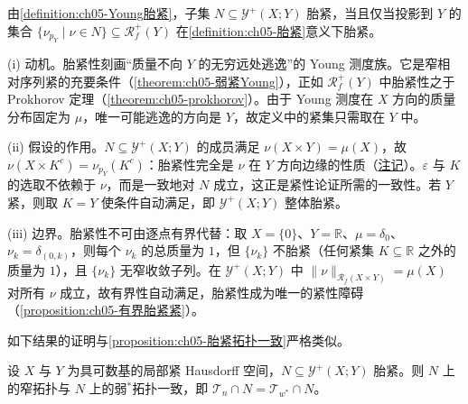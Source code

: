 \documentclass[../../main.tex]{subfiles}%
\begin{document}
\begin{remark}\label{remark:ch05-Young胎紧投影}
由\cref{definition:ch05-Young胎紧}，子集 $N\subseteq\mathcal{Y}^+(X;Y)$ 胎紧，当且仅当投影到 $Y$ 的集合 $\{\nu_{p_Y}\mid\nu\in N\}\subseteq\mathscr{R}^+_f(Y)$ 在\cref{definition:ch05-胎紧}意义下胎紧。
\end{remark}

\begin{remark}\label{remark:ch05-Young胎紧动机}
(i) 动机。胎紧性刻画“质量不向 $Y$ 的无穷远处逃逸”的 Young 测度族。它是窄相对序列紧的充要条件（\cref{theorem:ch05-弱紧Young}），正如 $\mathscr{R}^+_f(Y)$ 中胎紧性之于 Prokhorov 定理（\cref{theorem:ch05-prokhorov}）。由于 Young 测度在 $X$ 方向的质量分布固定为 $\mu$，唯一可能逃逸的方向是 $Y$，故定义中的紧集只需取在 $Y$ 中。

(ii) 假设的作用。$N\subseteq\mathcal{Y}^+(X;Y)$ 的成员满足 $\nu(X\times Y)=\mu(X)$，故 $\nu(X\times K^c)=\nu_{p_Y}(K^c)$：胎紧性完全是 $\nu$ 在 $Y$ 方向边缘的性质（\hyperref[remark:ch05-Young胎紧投影]{注记}）。$\varepsilon$ 与 $K$ 的选取不依赖于 $\nu$，而是一致地对 $N$ 成立，这正是紧性论证所需的一致性。若 $Y$ 紧，则取 $K=Y$ 使条件自动满足，即 $\mathcal{Y}^+(X;Y)$ 整体胎紧。

(iii) 边界。胎紧性不可由逐点有界代替：取 $X=\{0\}$、$Y=\mathbb{R}$、$\mu=\delta_0$、$\nu_k=\delta_{(0,k)}$，则每个 $\nu_k$ 的总质量为 $1$，但 $\{\nu_k\}$ 不胎紧（任何紧集 $K\subseteq\mathbb{R}$ 之外的质量为 $1$），且 $\{\nu_k\}$ 无窄收敛子列。在 $\mathcal{Y}^+(X;Y)$ 中 $\|\nu\|_{\mathscr{R}_f(X\times Y)}=\mu(X)$ 对所有 $\nu$ 成立，故有界性自动满足，胎紧性成为唯一的紧性障碍（\cref{proposition:ch05-有界胎紧紧}）。
\end{remark}

如下结果的证明与\cref{proposition:ch05-胎紧拓扑一致}严格类似。

\begin{proposition}\label{proposition:ch05-Young胎紧一致}\label{proposition:ch05-矩估计}
设 $X$ 与 $Y$ 为具可数基的局部紧 Hausdorff 空间，$N\subseteq\mathcal{Y}^+(X;Y)$ 胎紧。则 $N$ 上的窄拓扑与 $N$ 上的弱$^*$拓扑一致，即 $\mathcal{T}_n\cap N=\mathcal{T}_{w^*}\cap N$。
\end{proposition}
\end{document}
